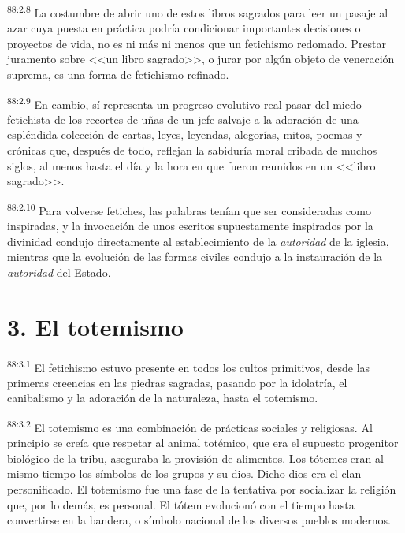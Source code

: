 \par
\textsuperscript{88:2.8} La costumbre de abrir uno de estos libros sagrados para leer un pasaje al azar cuya puesta en práctica podría condicionar importantes decisiones o proyectos de vida, no es ni más ni menos que un fetichismo redomado. Prestar juramento sobre <<un libro sagrado>>, o jurar por algún objeto de veneración suprema, es una forma de fetichismo refinado.

\par
\textsuperscript{88:2.9} En cambio, sí representa un progreso evolutivo real pasar del miedo fetichista de los recortes de uñas de un jefe salvaje a la adoración de una espléndida colección de cartas, leyes, leyendas, alegorías, mitos, poemas y crónicas que, después de todo, reflejan la sabiduría moral cribada de muchos siglos, al menos hasta el día y la hora en que fueron reunidos en un <<libro sagrado>>.

\par
\textsuperscript{88:2.10} Para volverse fetiches, las palabras tenían que ser consideradas como inspiradas, y la invocación de unos escritos supuestamente inspirados por la divinidad condujo directamente al establecimiento de la \textit{autoridad} de la iglesia, mientras que la evolución de las formas civiles condujo a la instauración de la \textit{autoridad} del Estado.

\section*{3. El totemismo}
\par
\textsuperscript{88:3.1} El fetichismo estuvo presente en todos los cultos primitivos, desde las primeras creencias en las piedras sagradas, pasando por la idolatría, el canibalismo y la adoración de la naturaleza, hasta el totemismo.

\par
\textsuperscript{88:3.2} El totemismo es una combinación de prácticas sociales y religiosas. Al principio se creía que respetar al animal totémico, que era el supuesto progenitor biológico de la tribu, aseguraba la provisión de alimentos. Los tótemes eran al mismo tiempo los símbolos de los grupos y su dios. Dicho dios era el clan personificado. El totemismo fue una fase de la tentativa por socializar la religión que, por lo demás, es personal. El tótem evolucionó con el tiempo hasta convertirse en la bandera, o símbolo nacional de los diversos pueblos modernos.

